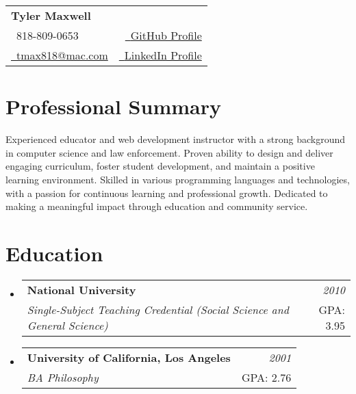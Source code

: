 \documentclass[a4paper,12pt]{article}
\makeatletter
\newcommand{\resumeSubheading}[4]{
\vspace{0.5mm}\item
    \begin{tabular*}{0.98\textwidth}[t]{l@{\extracolsep{\fill}}r}
        \textbf{#1} & \textit{\footnotesize{#4}} \\
        \textit{\footnotesize{#3}} &  \footnotesize{#2}\\
    \end{tabular*}
    \vspace{-2.4mm}
}
\newcommand{\resumeSubHeadingListStart}{\begin{itemize}[leftmargin=*,labelsep=0mm]}
\newcommand{\resumeSubHeadingListEnd}{\end{itemize}\vspace{2mm}}
\newcommand{\name}{Tyler Maxwell} %
\newcommand{\phone}{818-809-0653}
\newcommand{\emaila}{tmax818@mac.com}
\makeatother
\begin{document}
\selectfont


\parbox{\dimexpr\linewidth-0.3cm\relax}{
\begin{tabularx}{\linewidth}{L r} \\
  \textbf{\Large \name} \\ 
  {\raisebox{0.0\height}{\footnotesize \faPhone}\ \phone} & \href{https://github.com/tmax818}{\raisebox{0.0\height}{\footnotesize \faGithub}\ {GitHub Profile}}\\
  \href{mailto:\emaila}{\raisebox{0.0\height}{\footnotesize 
 \faEnvelope}\ {\emaila}}&\href{https://www.linkedin.com/in/tylermaxwell/}{\raisebox{0.0\height}{\footnotesize \faLinkedin}\ {LinkedIn Profile}}
\end{tabularx}
}


\section{\textbf{Professional Summary}}

Experienced educator and web development instructor with a strong background in computer science and law enforcement. Proven ability to design and deliver engaging curriculum, foster student development, and maintain a positive learning environment. Skilled in various programming languages and technologies, with a passion for continuous learning and professional growth. Dedicated to making a meaningful impact through education and community service.

\section{\textbf{Education}}
  \resumeSubHeadingListStart
    \resumeSubheading
      {National University}{GPA: 3.95}
      {Single-Subject Teaching Credential (Social Science and General Science)}{2010}
    \resumeSubheading
      {University of California, Los Angeles}{GPA: 2.76}
      {BA Philosophy}{2001}
  \resumeSubHeadingListEnd
%

\end{document}
